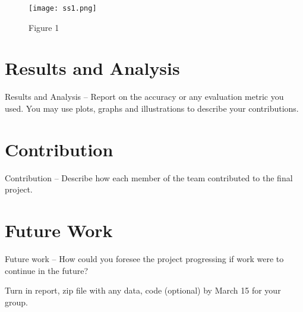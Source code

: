 \documentclass[10.5pt, twocolumn]{acmart}
\begin{document}
\begin{figure}[h] 	
\centering
\texttt{[image: ss1.png]}
\caption{Figure 1}
\end{figure}


\section{Results and Analysis}
Results and Analysis – Report on the accuracy or any evaluation metric you used. You may use
plots, graphs and
illustrations to describe your contributions.

\section{Contribution}
Contribution – Describe how each member of the team contributed to the final project.


\section{Future Work}
Future work – How could you foresee the project progressing if work were to continue in the
future?


Turn in report, zip file with any data, code (optional) by March 15 for your group.
\end{document}
